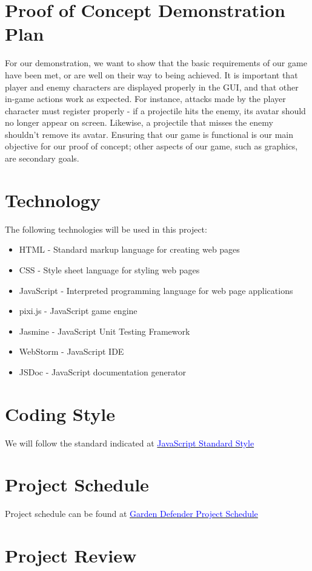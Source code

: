 \documentclass{article}
\begin{document}
\section{Proof of Concept Demonstration Plan}

For our demonstration, we want to show that the basic requirements of our game have been met, or are well on their way to being achieved. It is important that player and enemy characters are displayed properly in the GUI, and that other in-game actions work as expected.  For instance, attacks made by the player character must register properly - if a projectile hits the enemy, its avatar should no longer appear on screen. Likewise, a projectile that misses the enemy shouldn't remove its avatar. Ensuring that our game is functional is our main objective for our proof of concept; other aspects of our game, such as graphics, are secondary goals.


\section{Technology}
The following technologies will be used in this project:
\begin{itemize}

  \item HTML - Standard markup language for creating web pages
  \item CSS -  Style sheet language for styling web pages
  \item JavaScript - Interpreted programming language for web page applications
  \item pixi.js - JavaScript game engine
  \item Jasmine - JavaScript Unit Testing Framework
  \item WebStorm - JavaScript IDE
  \item JSDoc - JavaScript documentation generator

\end{itemize}


\section{Coding Style}
 We will follow the standard indicated at \href{https://standardjs.com/}{\textcolor{blue} {JavaScript Standard Style}}

\section{Project Schedule}

Project schedule can be found at  \href{https://gitlab.cas.mcmaster.ca/shiy12/3XA3Group29/tree/master/Game1/ProjectSchedule}{\textcolor{blue} {Garden Defender Project Schedule}}

\section{Project Review}
\end{document}
